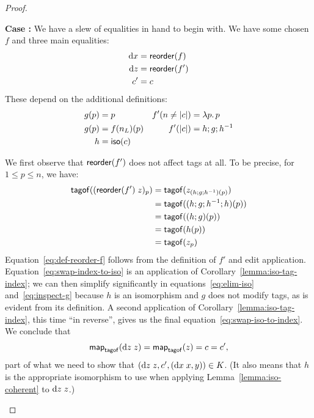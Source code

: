 \begin{proof}
{\begin{trivlist}
\item {\bf Case :} We have a slew of equalities in hand to
    begin with. We have some chosen $f$ and three main equalities:
    \begin{align*}
        \textrm{d} x &= \mathsf{reorder}(f) \\
        \textrm{d} z &= \mathsf{reorder}(f') \\
        c' &= c
    \end{align*}
    These depend on the additional definitions:
    \begin{align*}
        g( p) &=  p &
        f'(n \ne |c|) &= \lambda p.\,p \\
        g( p) &= {f(n_L)(p)} &
        f'(|c|) &= h;g;h^{-1} \\
        h &= \mathsf{iso}(c)
    \end{align*}

    We first observe that $\mathsf{reorder}(f')$ does not affect tags at all. To
    be precise, for $1 \le p \le n$, we have:
    \begin{align}
        \mathsf{tagof}((\mathsf{reorder}(f')\;z)_p)
            &= \mathsf{tagof}(z_{(h;g;h^{-1})(p)})
            \label{eq:def-reorder-f} \\
            &= \mathsf{tagof}((h;g;h^{-1};h)(p))
            \label{eq:swap-index-to-iso} \\
            &= \mathsf{tagof}((h;g)(p))
            \label{eq:elim-iso} \\
            &= \mathsf{tagof}(h(p))
            \label{eq:inspect-g} \\
            &= \mathsf{tagof}(z_p)
            \label{eq:swap-iso-to-index}
    \end{align}
    Equation~\ref{eq:def-reorder-f} follows from the definition of $f'$ and
    edit application. Equation~\ref{eq:swap-index-to-iso} is an application
    of Corollary~\ref{lemma:iso-tag-index}; we can then simplify
    significantly in equations~\ref{eq:elim-iso} and~\ref{eq:inspect-g}
    because $h$ is an isomorphism and $g$ does not modify tags, as is
    evident from its definition. A second application of
    Corollary~\ref{lemma:iso-tag-index}, this time ``in reverse'', gives us
    the final equation~\ref{eq:swap-iso-to-index}. We conclude that
    \[\mathsf{map}_{\mathsf{tagof}}(\textrm{d} z\;z) = \mathsf{map}_{\mathsf{tagof}}(z) = c = c',\]
    part of what we need to show that $(\textrm{d} z\;z,c',(\textrm{d} x\;x,y))\in K$. (It
    also means that $h$ is the appropriate isomorphism to use when applying
    Lemma~\ref{lemma:iso-coherent} to $\textrm{d} z\;z$.)


\end{trivlist}}
\end{proof}
